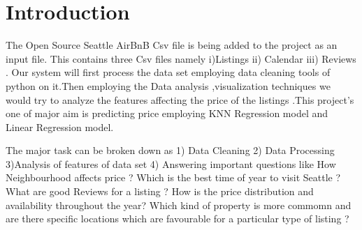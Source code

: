 \section{Introduction}

\begin{block}
\color{gray}
The Open Source Seattle AirBnB Csv file is being added to the project as an input file. This contains three Csv files namely i)Listings ii) Calendar iii) Reviews .
Our system will first process the data set employing data cleaning tools of python on it.Then employing the Data analysis ,visualization techniques we would try to analyze the features affecting the price of the listings .This project's one of  major aim is predicting price employing KNN Regression model and Linear Regression model.


The major task can be broken down as 1) Data Cleaning 2) Data Processing 3)Analysis of features of data set 4) Answering important questions like How Neighbourhood affects price ? Which is the best time of year to visit Seattle ? What are good Reviews for a listing ? How is the price distribution and availability throughout the year?
Which kind of property is more commomn and are there specific locations which are favourable for a particular type of listing ?

\end{block}